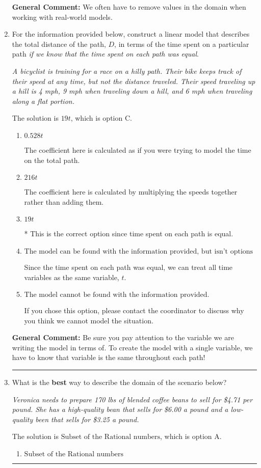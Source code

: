 \documentclass{extbook}[14pt]
\newcommand{\litem}[1]{\item #1

\rule{\textwidth}{0.4pt}}
\begin{document}
\begin{enumerate}
{\textbf{General Comment:} We often have to remove values in the domain when working with real-world models.
}
\litem{
For the information provided below, construct a linear model that describes the total distance of the path, $D$, in terms of the time spent on a particular path \textit{if we know that the time spent on each path was equal}.

\begin{center}
    \textit{ A bicyclist is training for a race on a hilly path. Their bike keeps track of their speed at any time, but not the distance traveled. Their speed traveling up a hill is 4 mph, 9 mph when traveling down a hill, and 6 mph when traveling along a flat portion. }
\end{center}
The solution is \( 19 t \), which is option C.\begin{enumerate}[label=\Alph*.]
\item \( 0.528 t \)

The coefficient here is calculated as if you were trying to model the time on the total path.
\item \( 216 t \)

The coefficient here is calculated by multiplying the speeds together rather than adding them.
\item \( 19 t \)

* This is the correct option since time spent on each path is equal.
\item \( \text{The model can be found with the information provided, but isn't options 1-3.} \)

Since the time spent on each path was equal, we can treat all time variables as the same variable, $t$.
\item \( \text{The model cannot be found with the information provided.} \)

If you chose this option, please contact the coordinator to discuss why you think we cannot model the situation.
\end{enumerate}

\textbf{General Comment:} Be sure you pay attention to the variable we are writing the model in terms of. To create the model with a single variable, we have to know that variable is the same throughout each path!
}
\litem{
What is the \textbf{best} way to describe the domain of the scenario below?

\begin{center}
    \textit{ Veronica needs to prepare 170 lbs of blended coffee beans to sell for \$4.71 per pound. She has a high-quality bean that sells for \$6.00 a pound and a low-quality been that sells for \$3.25 a pound. }
\end{center}
The solution is \( \text{Subset of the Rational numbers} \), which is option A.\begin{enumerate}[label=\Alph*.]
\item \( \text{Subset of the Rational numbers} \)


\end{enumerate}}
\end{enumerate}
\end{document}

